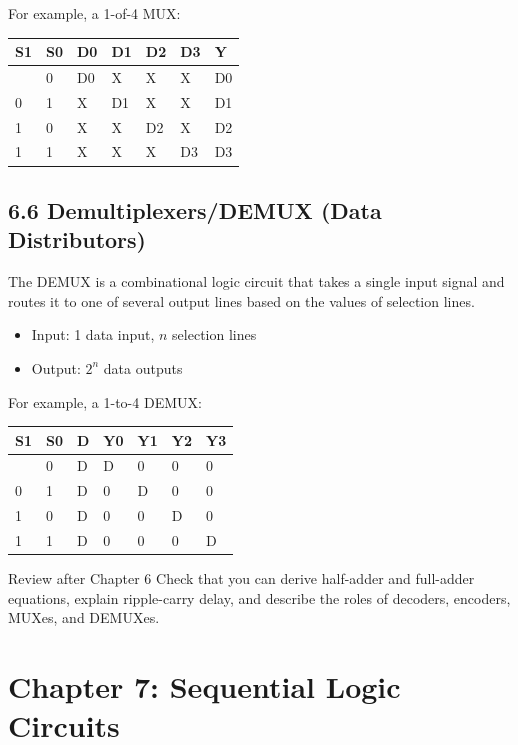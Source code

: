 \documentclass[11pt,a4paper]{article}
\providecommand{\tightlist}{\setlength{\itemsep}{1pt}\setlength{\parskip}{0pt}}
\begin{document}
For example, a 1-of-4 MUX:

\begin{longtable}[]{@{}lllllll@{}}
\toprule\noalign{}
S1 & S0 & D0 & D1 & D2 & D3 & Y \\
\midrule\noalign{}
\endhead
\bottomrule\noalign{}
\endlastfoot
0 & 0 & D0 & X & X & X & D0 \\
0 & 1 & X & D1 & X & X & D1 \\
1 & 0 & X & X & D2 & X & D2 \\
1 & 1 & X & X & X & D3 & D3 \\
\end{longtable}

\subsection{6.6 Demultiplexers/DEMUX (Data
Distributors)}\label{demultiplexersdemux-data-distributors}

The DEMUX is a combinational logic circuit that takes a single input
signal and routes it to one of several output lines based on the values
of selection lines.

\begin{itemize}
\tightlist
\item
  Input: 1 data input, \(n\) selection lines
\item
  Output: \(2^n\) data outputs
\end{itemize}

For example, a 1-to-4 DEMUX:

\begin{longtable}[]{@{}lllllll@{}}
\toprule\noalign{}
S1 & S0 & D & Y0 & Y1 & Y2 & Y3 \\
\midrule\noalign{}
\endhead
\bottomrule\noalign{}
\endlastfoot
0 & 0 & D & D & 0 & 0 & 0 \\
0 & 1 & D & 0 & D & 0 & 0 \\
1 & 0 & D & 0 & 0 & D & 0 \\
1 & 1 & D & 0 & 0 & 0 & D \\
\end{longtable}

\begin{notebox}{Review after Chapter 6}
Check that you can derive half-adder and full-adder equations, explain ripple-carry delay, and describe the roles of decoders, encoders, MUXes, and DEMUXes.
\end{notebox}

\section{Chapter 7: Sequential Logic
Circuits}\label{chapter-7-sequential-logic-circuits}
\end{document}
